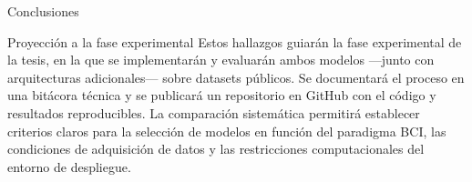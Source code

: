\documentclass{beamer}
\begin{document}
\begin{frame}{Conclusiones}
\begin{block}{Proyección a la fase experimental}
Estos hallazgos guiarán la fase experimental de la tesis, en la que se implementarán y evaluarán ambos modelos —junto con arquitecturas adicionales— sobre datasets públicos.  
Se documentará el proceso en una bitácora técnica y se publicará un repositorio en GitHub con el código y resultados reproducibles.  
La comparación sistemática permitirá establecer criterios claros para la selección de modelos en función del paradigma BCI, las condiciones de adquisición de datos y las restricciones computacionales del entorno de despliegue.
\end{block}
\end{frame}
\end{document}
